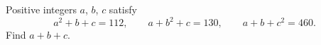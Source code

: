 Positive integers $a$, $b$, $c$ satisfy
\[
a^2+b+c=112,\qquad a+b^2+c=130,\qquad a+b+c^2=460 .
\]
Find $a+b+c$.
